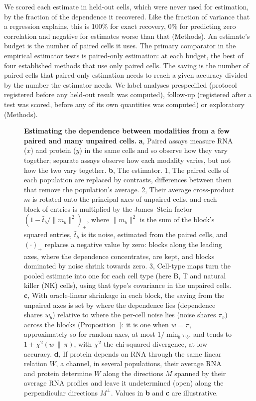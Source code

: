 \documentclass[pdflatex,sn-vancouver-num,iicol]{sn-jnl}
\begin{document}
We scored each estimate in held-out cells, which were never used for estimation, by the fraction of the dependence it recovered. Like the fraction of variance that a regression explains, this is 100\% for exact recovery, 0\% for predicting zero correlation and negative for estimates worse than that (Methods). An estimate's budget is the number of paired cells it uses. The primary comparator in the empirical estimator tests is paired-only estimation: at each budget, the best of four established methods that use only paired cells. The saving is the number of paired cells that paired-only estimation needs to reach a given accuracy divided by the number the estimator needs. We label analyses prespecified (protocol registered before any held-out result was computed), follow-up (registered after a test was scored, before any of its own quantities was computed) or exploratory (Methods).

\begin{figure}[tp]
\centering
\resizebox{\textwidth}{!}{}
\caption{\textbf{Estimating the dependence between modalities from a few paired and many unpaired cells.}
\textbf{a}, Paired assays measure RNA ($x$) and protein ($y$) in the same cells and so observe how they vary together; separate assays observe how each modality varies, but not how the two vary together.
\textbf{b}, The estimator. 1, The paired cells of each population are replaced by contrasts, differences between them that remove the population's average. 2, Their average cross-product $m$ is rotated onto the principal axes of unpaired cells, and each block of entries is multiplied by the James--Stein factor $(1-\hat t_b/\|m_b\|^2)_+$, where $\|m_b\|^2$ is the sum of the block's squared entries, $\hat t_b$ is its noise, estimated from the paired cells, and $(\cdot)_+$ replaces a negative value by zero: blocks along the leading axes, where the dependence concentrates, are kept, and blocks dominated by noise shrink towards zero. 3, Cell-type maps turn the pooled estimate into one for each cell type (here B, T and natural killer (NK) cells), using that type's covariance in the unpaired cells.
\textbf{c}, With oracle-linear shrinkage in each block, the saving from the unpaired axes is set by where the dependence lies (dependence shares $w_b$) relative to where the per-cell noise lies (noise shares $\pi_b$) across the blocks (Proposition~): it is one when $w=\pi$, approximately so for random axes, at most $1/\min_b\pi_b$, and tends to $1+\chi^2(w\,\|\,\pi)$, with $\chi^2$ the chi-squared divergence, at low accuracy.
\textbf{d}, If protein depends on RNA through the same linear relation $W$, a channel, in several populations, their average RNA and protein determine $W$ along the directions $M$ spanned by their average RNA profiles and leave it undetermined (open) along the perpendicular directions $M^\perp$.
Values in \textbf{b} and \textbf{c} are illustrative.}
\label{fig:overview}
\end{figure}
\end{document}
